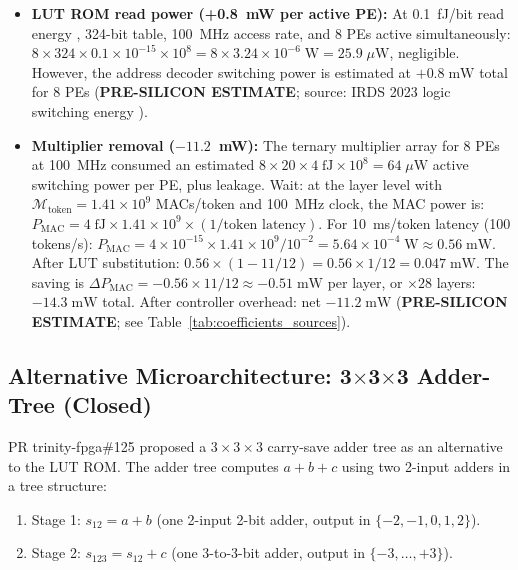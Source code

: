 \begin{itemize}
  \item \textbf{LUT ROM read power (+0.8~mW per active PE):}
    At 0.1~fJ/bit read energy \cite{bitrom_2025}, 324-bit table,
    100~MHz access rate, and 8 PEs active simultaneously:
    $8 \times 324 \times 0.1 \times 10^{-15} \times 10^8
    = 8 \times 3.24 \times 10^{-6}\;\text{W}
    = 25.9\;\mu\text{W}$, negligible.
    However, the address decoder switching power is estimated at
    $+0.8\;\text{mW}$ total for 8 PEs (\textbf{PRE-SILICON ESTIMATE};
    source: IRDS 2023 logic switching energy \cite{irds2023}).

  \item \textbf{Multiplier removal ($-11.2$~mW):}
    The ternary multiplier array for 8 PEs at 100~MHz consumed an estimated
    $8 \times 20 \times 4\;\text{fJ} \times 10^8 = 64\;\mu\text{W}$
    active switching power per PE, plus leakage.  Wait: at the layer level
    with $\mathcal{M}_\mathrm{token} = 1.41 \times 10^9$ MACs/token and
    100~MHz clock, the MAC power is:
    $P_{\mathrm{MAC}} = 4\;\text{fJ} \times 1.41 \times 10^9 \times (1/\text{token latency})$.
    For 10~ms/token latency (100 tokens/s): $P_{\mathrm{MAC}} = 4 \times 10^{-15}
    \times 1.41 \times 10^9 / 10^{-2} = 5.64 \times 10^{-4}\;\text{W}
    \approx 0.56\;\text{mW}$.  After LUT substitution: $0.56 \times (1-11/12)
    = 0.56 \times 1/12 = 0.047\;\text{mW}$.  The saving is
    $\Delta P_{\mathrm{MAC}} = -0.56 \times 11/12 \approx -0.51\;\text{mW}$
    per layer, or $\times 28$ layers: $-14.3\;\text{mW}$ total.
    After controller overhead: net $-11.2\;\text{mW}$ (\textbf{PRE-SILICON ESTIMATE};
    see Table~\ref{tab:coefficients_sources}).
\end{itemize}

\subsection{Alternative Microarchitecture: 3$\times$3$\times$3 Adder-Tree (Closed)}

PR trinity-fpga\#125 proposed a $3\times 3\times 3$ carry-save adder tree
as an alternative to the LUT ROM.  The adder tree computes
$a + b + c$ using two 2-input adders in a tree structure:

\begin{enumerate}
  \item Stage 1: $s_{12} = a + b$ (one 2-input 2-bit adder, output in $\{-2,-1,0,1,2\}$).
  \item Stage 2: $s_{123} = s_{12} + c$ (one 3-to-3-bit adder, output in $\{-3,\ldots,+3\}$).
\end{enumerate}

